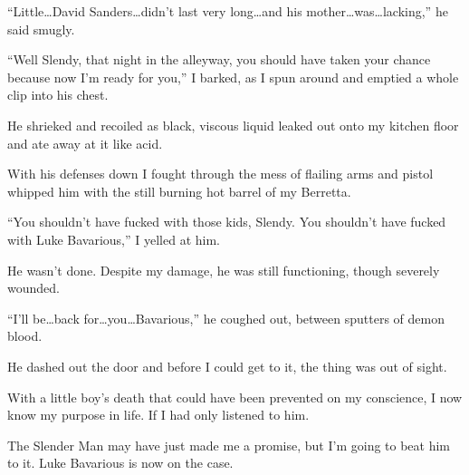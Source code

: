 ``Little{\ldots}David Sanders{\ldots}didn't last very
long{\ldots}and his mother{\ldots}was{\ldots}lacking,'' he
said smugly.



``Well Slendy, that night in the alleyway, you should have
taken your chance because now I'm ready for you,'' I
barked, as I spun around and emptied a whole clip into his
chest.



He shrieked and recoiled as black, viscous liquid leaked out onto
my kitchen floor and ate away at it like acid.



With his defenses down I fought through the mess of flailing arms
and pistol whipped him with the still burning hot barrel of my
Berretta.



``You shouldn't have fucked with those kids, Slendy. You
shouldn't have fucked with Luke Bavarious,'' I yelled at
him.



He wasn't done. Despite my damage, he was still functioning,
though severely wounded.



``I'll be{\ldots}back
for{\ldots}you{\ldots}Bavarious,'' he coughed out, between
sputters of demon blood.



He dashed out the door and before I could get to it, the thing was
out of sight.



With a little boy's death that could have been prevented on
my conscience, I now know my purpose in life. If I had only
listened to him.



The Slender Man may have just made me a promise, but I'm
going to beat him to it. Luke Bavarious is now on the case. 

 






